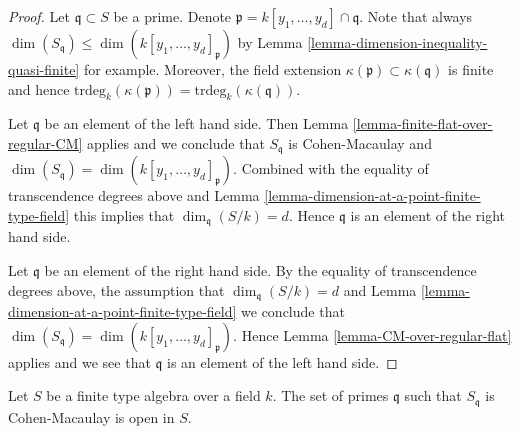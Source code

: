 \begin{proof}
Let $\mathfrak q \subset S$ be a prime. Denote
$\mathfrak p = k[y_1, \ldots, y_d] \cap \mathfrak q$.
Note that always
$\dim(S_{\mathfrak q}) \leq \dim(k[y_1, \ldots, y_d]_{\mathfrak p})$
by Lemma \ref{lemma-dimension-inequality-quasi-finite} for example.
Moreover, the field extension $\kappa(\mathfrak p) \subset \kappa(\mathfrak q)$
is finite and hence
$\text{trdeg}_k(\kappa(\mathfrak p)) = \text{trdeg}_k(\kappa(\mathfrak q))$.

\medskip\noindent
Let $\mathfrak q$ be an element of the left hand side.
Then Lemma \ref{lemma-finite-flat-over-regular-CM} applies
and we conclude that $S_{\mathfrak q}$ is Cohen-Macaulay
and $\dim(S_{\mathfrak q}) = \dim(k[y_1, \ldots, y_d]_{\mathfrak p})$.
Combined with the equality of transcendence degrees above and
Lemma \ref{lemma-dimension-at-a-point-finite-type-field} this
implies that $\dim_{\mathfrak q}(S/k) = d$. Hence $\mathfrak q$
is an element of the right hand side.

\medskip\noindent
Let $\mathfrak q$ be an element of the right hand side.
By the equality of transcendence degrees above, the assumption
that $\dim_{\mathfrak q}(S/k) = d$ and
Lemma \ref{lemma-dimension-at-a-point-finite-type-field} 
we conclude that
$\dim(S_{\mathfrak q}) = \dim(k[y_1, \ldots, y_d]_{\mathfrak p})$.
Hence Lemma \ref{lemma-CM-over-regular-flat}
applies and we see that $\mathfrak q$ is an
element of the left hand side.
\end{proof}

\begin{lemma}
\label{lemma-finite-type-over-field-CM-open}
Let $S$ be a finite type algebra over a field $k$.
The set of primes $\mathfrak q$ such that $S_{\mathfrak q}$ is
Cohen-Macaulay is open in $S$.
\end{lemma}

